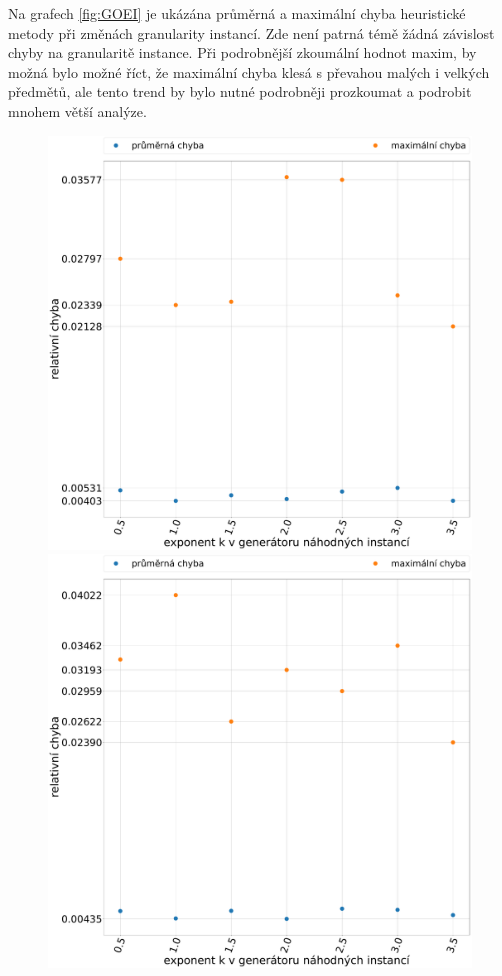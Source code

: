\documentclass[11pt]{article}
\begin{document}
Na grafech \ref{fig:GOEI} je ukázána průměrná a maximální chyba heuristické metody při změnách granularity instancí. Zde není patrná témě žádná závislost chyby na granularitě instance. Při podrobnější zkoumální hodnot maxim, by možná bylo možné říct, že maximální chyba klesá s převahou malých i velkých předmětů, ale tento trend by bylo nutné podrobněji prozkoumat a podrobit mnohem větší analýze.
 
 \begin{figure}
	\centering
    \begin{minipage}[c]{0.49\textwidth}
        \centering\includegraphics[width=\textwidth]{img/GMHE.pdf} 
    \end{minipage}
    \begin{minipage}[c]{0.49\textwidth}
        \centering \includegraphics[width=\textwidth]{img/GVHE.pdf} 

\end{minipage}
\end{figure}
\end{document}
